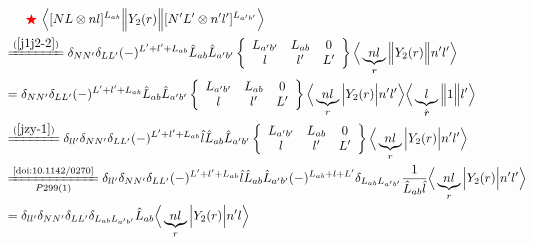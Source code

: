 \documentclass[master]{shnuthesis}
\newcommand{\bmr}{\textbf{\textit{r}}}
\newcommand{\ap}{a^\prime}
\newcommand{\bp}{b^\prime}
\newcommand{\il}{\!\!\!\!\!\!\!\!\!\!}
\newcommand{\zdydh}{\xlongequal}
\newcommand{\redstar}{{\color{red} \bigstar}\,\,}
\begin{document}
\begin{align}
    & \redstar \Big\langle [N L \otimes n l]^{L_{ab}} \Big\| Y_2(r) \Big\| [N^\prime L^\prime \otimes n^\prime l^\prime]^{L_{\ap\bp}} \Big\rangle \notag\\
    &\il \zdydh{(\ref{j1j2-2})} \delta_{NN^\prime}\delta_{LL^\prime}(-)^{L^\prime+l^\prime+L_{ab}} \hat{L}_{ab}\hat{L}_{\ap\bp}  \left\{\begin{array}{ccc} L_{\ap\bp} & L_{ab} & 0 \\ l & l^\prime & L^\prime \end{array}\right\}  \Big\langle \underbrace{n l}_{\bmr} \Big\| Y_2(r) \Big\| n^\prime l^\prime \Big\rangle \\
    &\il = \delta_{NN^\prime}\delta_{LL^\prime}(-)^{L^\prime+l^\prime+L_{ab}} \hat{L}_{ab}\hat{L}_{\ap\bp}  \left\{\begin{array}{ccc} L_{\ap\bp} & L_{ab} & 0 \\ l & l^\prime & L^\prime \end{array}\right\}  \Big\langle \underbrace{n l}_{r} \Big| Y_2(r) \Big| n^\prime l^\prime \Big\rangle \Big\langle \underbrace{l}_{\hat{\bmr}} \Big\| 1 \Big\| l^\prime \Big\rangle \\
    &\il \zdydh{(\ref{jzy-1})} \delta_{ll^\prime}\delta_{NN^\prime}\delta_{LL^\prime}(-)^{L^\prime+l^\prime+L_{ab}} \hat{l}\hat{L}_{ab}\hat{L}_{\ap\bp}  \left\{\begin{array}{ccc} L_{\ap\bp} & L_{ab} & 0 \\ l & l^\prime & L^\prime \end{array}\right\}  \Big\langle \underbrace{n l}_{r} \Big| Y_2(r) \Big| n^\prime l^\prime \Big\rangle \\
    &\il \zdydh[P299(1)]{\text{\cite{doi:10.1142/0270}}} \delta_{ll^\prime}\delta_{NN^\prime}\delta_{LL^\prime}(-)^{L^\prime+l^\prime+L_{ab}} \hat{l}\hat{L}_{ab}\hat{L}_{\ap\bp} (-)^{L_{ab}+l+L^\prime}\delta_{L_{ab}L_{\ap\bp}}\frac{1}{\hat{L}_{ab}\hat{l}} \Big\langle \underbrace{n l}_{r} \Big| Y_2(r) \Big| n^\prime l^\prime \Big\rangle \\
    &\il = \delta_{ll^\prime}\delta_{NN^\prime}\delta_{LL^\prime}\delta_{L_{ab}L_{\ap\bp}} \hat{L}_{ab} \Big\langle \underbrace{n l}_{r} \Big| Y_2(r) \Big| n^\prime l \Big\rangle \label{Ll-Y2}
\end{align}
\end{document}
